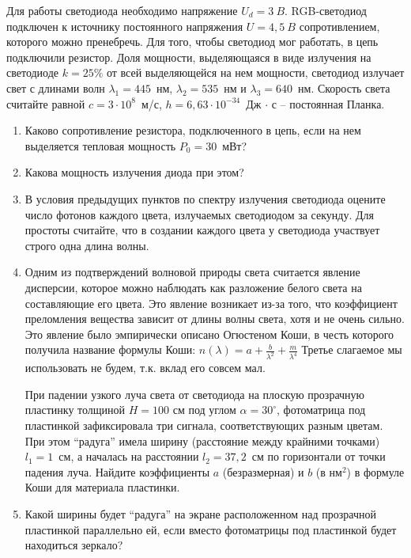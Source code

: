 
Для работы светодиода необходимо напряжение $U_d = 3~B$. RGB-светодиод подключен к источнику постоянного 
напряжения $U = 4,5~B$ сопротивлением, которого можно пренебречь. Для того, чтобы светодиод мог работать, в цепь 
подключили резистор. Доля мощности, выделяющаяся в виде излучения на светодиоде $k = 25\%$ от всей выделяющейся на нем мощности, светодиод излучает 
свет с длинами волн $\lambda_1=445$~нм, $\lambda_2=535$~нм и $\lambda_3=640$~нм. Скорость света считайте равной 
$c=3 \cdot 10^8$~м/с, $h = 6,63 \cdot 10^{-34}$~Дж $\cdot$ с – постоянная Планка.

\begin{enumerate}
    \item Каково сопротивление резистора, подключенного в цепь, если на нем выделяется тепловая мощность $P_0 = 30$~мВт?
    \item Какова мощность излучения диода при этом?
    \item В условия предыдущих пунктов по спектру излучения светодиода оцените число фотонов каждого цвета, излучаемых светодиодом за секунду. Для простоты считайте, что в создании каждого цвета у светодиода участвует строго одна длина волны.
    \item Одним из подтверждений волновой природы света считается явление дисперсии, которое можно наблюдать 
    как разложение белого света на составляющие его цвета. Это явление возникает из-за того, что коэффициент 
    преломления вещества зависит от длины волны света, хотя и не очень сильно. Это явление было эмпирически 
    описано Огюстеном Коши, в честь которого получила название формулы Коши: $n(\lambda)=a+\frac{b}{\lambda^2} + \frac{m}{\lambda^4}$  
    Третье слагаемое мы использовать не будем, т.к. вклад его совсем мал.
    
    При падении узкого луча света от светодиода на плоскую прозрачную пластинку толщиной $H = 100$ см под углом 
    $\alpha = 30^{\circ}$, фотоматрица под пластинкой зафиксировала три сигнала, соответствующих разным цветам. 
    При этом “радуга” имела ширину (расстояние между крайними точками) $l_1 = 1$~см, а началась на расстоянии 
    $l_2 = 37,2$~см по горизонтали от точки падения луча. Найдите коэффициенты $a$ (безразмерная) и $b$ (в нм$^2$) в 
    формуле Коши для материала пластинки.
    \item Какой ширины будет “радуга” на экране расположенном над прозрачной пластинкой параллельно ей, если вместо фотоматрицы под пластинкой будет находиться зеркало?
\end{enumerate}